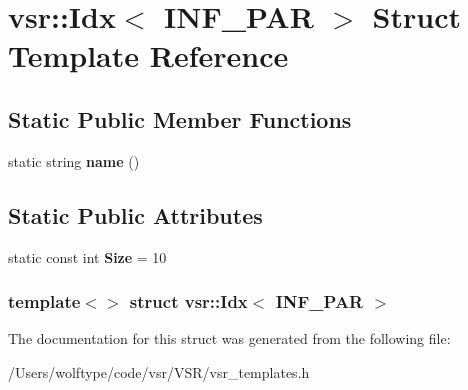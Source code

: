 \hypertarget{structvsr_1_1_idx_3_01_i_n_f___p_a_r_01_4}{\section{vsr\-:\-:Idx$<$ I\-N\-F\-\_\-\-P\-A\-R $>$ Struct Template Reference}
\label{structvsr_1_1_idx_3_01_i_n_f___p_a_r_01_4}
}
\subsection*{Static Public Member Functions}
\begin{DoxyCompactItemize}
\item 
\hypertarget{structvsr_1_1_idx_3_01_i_n_f___p_a_r_01_4_aa49bad530709772e3c02a92b00b62c7f}{static string {\bfseries name} ()}\label{structvsr_1_1_idx_3_01_i_n_f___p_a_r_01_4_aa49bad530709772e3c02a92b00b62c7f}

\end{DoxyCompactItemize}
\subsection*{Static Public Attributes}
\begin{DoxyCompactItemize}
\item 
\hypertarget{structvsr_1_1_idx_3_01_i_n_f___p_a_r_01_4_a1c0464114a2afa8b1ba8ca047d5bd9e3}{static const int {\bfseries Size} = 10}\label{structvsr_1_1_idx_3_01_i_n_f___p_a_r_01_4_a1c0464114a2afa8b1ba8ca047d5bd9e3}

\end{DoxyCompactItemize}
\subsubsection*{template$<$$>$ struct vsr\-::\-Idx$<$ I\-N\-F\-\_\-\-P\-A\-R $>$}



The documentation for this struct was generated from the following file\-:\begin{DoxyCompactItemize}
\item 
/\-Users/wolftype/code/vsr/\-V\-S\-R/vsr\-\_\-templates.\-h\end{DoxyCompactItemize}
